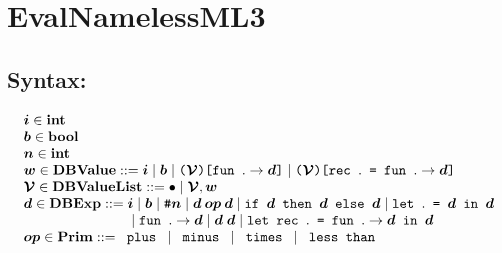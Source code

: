 \documentclass[11pt]{jarticle}
\begin{document}
\newpage

\section*{EvalNamelessML3}



\subsection*{Syntax:}

\[\begin{array}{l}
\EvalNamelessMLiiiMV{i}[] \in \mathbf{int}\\
\EvalNamelessMLiiiMV{b}[] \in \mathbf{bool}\\
\EvalNamelessMLiiiMV{n}[] \in \mathbf{int}\\
\EvalNamelessMLiiiMV{v}[] \in \mathbf{DBValue} ::= \EvalNamelessMLiiiMV{i}[]
\mid \EvalNamelessMLiiiMV{b}[]
\mid \EvalNamelessMLiiiFunTerm{\EvalNamelessMLiiiMV{env}[]}
{\EvalNamelessMLiiiMV{d}[]}
\mid \EvalNamelessMLiiiRecTerm{\EvalNamelessMLiiiMV{env}[]}
{\EvalNamelessMLiiiMV{d}[]}\\
\EvalNamelessMLiiiMV{env}[] \in \mathbf{DBValueList} ::=
\EvalNamelessMLiiiEmptyTerm
\mid \EvalNamelessMLiiiBindTerm{\EvalNamelessMLiiiMV{env}[]}
{\EvalNamelessMLiiiMV{v}[]}\\
\EvalNamelessMLiiiMV{d}[] \in \mathbf{DBExp} ::= \EvalNamelessMLiiiMV{i}[]
\mid \EvalNamelessMLiiiMV{b}[]
\mid \EvalNamelessMLiiiIndexTerm{\EvalNamelessMLiiiMV{n}[]}
\mid \EvalNamelessMLiiiBinOpDTerm{\EvalNamelessMLiiiMV{op}[]}
{\EvalNamelessMLiiiMV{d}[]}{\EvalNamelessMLiiiMV{d}[]}
\mid \EvalNamelessMLiiiIfDTerm{\EvalNamelessMLiiiMV{d}[]}
{\EvalNamelessMLiiiMV{d}[]}{\EvalNamelessMLiiiMV{d}[]}
\mid \EvalNamelessMLiiiLetDTerm{\EvalNamelessMLiiiMV{d}[]}
{\EvalNamelessMLiiiMV{d}[]}
\\ \hspace*{2.7cm}
\mid \EvalNamelessMLiiiAbsDTerm{\EvalNamelessMLiiiMV{d}[]}
\mid \EvalNamelessMLiiiAppDTerm{\EvalNamelessMLiiiMV{d}[]}
{\EvalNamelessMLiiiMV{d}[]}
\mid \EvalNamelessMLiiiLetRecDTerm{\EvalNamelessMLiiiMV{d}[]}
{\EvalNamelessMLiiiMV{d}[]}\\
\EvalNamelessMLiiiMV{op}[] \in \mathbf{Prim} ::= \EvalNamelessMLiiiPlusTerm
\mid \EvalNamelessMLiiiMinusTerm \mid \EvalNamelessMLiiiMultTerm
\mid \EvalNamelessMLiiiLtTerm\\
\end{array}\]
\end{document}
